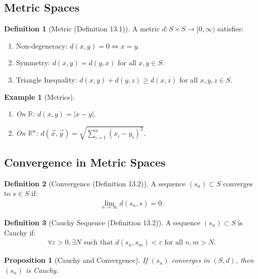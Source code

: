 \documentclass[9pt]{article}
\theoremstyle{definition}
\newtheorem{definition}{Definition}
\theoremstyle{plain}
\newtheorem{proposition}{Proposition}
\newtheorem{example}{Example}
\begin{document}
\subsection*{Metric Spaces}
\begin{definition}[Metric (Definition 13.1)]
A metric $ d : S \times S \to [0, \infty) $ satisfies:
\begin{enumerate}[label=(D\arabic*)]
    \item {Non-degeneracy:} $ d(x, y) = 0 \iff x = y $.
    \item {Symmetry:} $ d(x, y) = d(y, x) $ for all $ x, y \in S $.
    \item {Triangle Inequality:} $ d(x, y) + d(y, z) \geq d(x, z) $ for all $ x, y, z \in S $.
\end{enumerate}
\end{definition}

\begin{example}[Metrics]

\begin{enumerate}
    \item On $ \mathbb{R} $: $ d(x, y) = |x - y| $.
    \item On $ \mathbb{R}^n $: $ d(\vec{x}, \vec{y}) = \sqrt{\sum_{i=1}^n (x_i - y_i)^2} $.
\end{enumerate}
\end{example}

\subsection*{Convergence in Metric Spaces}
\begin{definition}[Convergence (Definition 13.2)]
A sequence $ (s_n) \subset S $ converges to $ s \in S $ if:
\begin{align}
\lim_{n \to \infty} d(s_n, s) = 0.
\end{align}
\end{definition}

\begin{definition}[Cauchy Sequence (Definition 13.2)]
A sequence $ (s_n) \subset S $ is Cauchy if:
\begin{align}
\forall \varepsilon > 0, \exists N \text{ such that } d(s_n, s_m) < \varepsilon \text{ for all } n, m > N.
\end{align}
\end{definition}

\begin{proposition}[Cauchy and Convergence]
If $ (s_n) $ converges in $ (S, d) $, then $ (s_n) $ is Cauchy.
\end{proposition}
\end{document}

